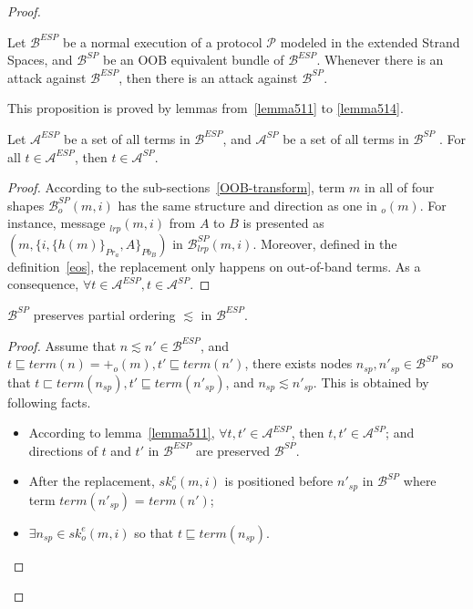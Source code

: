 \begin{Definition}
\begin{table}[b]
\begin{proof}
\begin{Proposition}
Let $\mathcal{B}^{ESP}$ be a normal execution of a protocol $\mathcal{P}$ modeled in the extended Strand Spaces, and $\mathcal{B}^{SP}$ be an OOB equivalent bundle of $\mathcal{B}^{ESP}$. Whenever there is an attack against $\mathcal{B}^{ESP}$, then there is an attack against $\mathcal{B}^{SP}$. 
\end{Proposition}

This proposition is proved by lemmas from~\ref{lemma511} to \ref{lemma514}. 

\begin{Lemma}\label{lemma511}
Let $\mathcal{A}^{ESP}$ be a set of all terms in $\mathcal{B}^{ESP}$, and $\mathcal{A}^{SP}$ be a set of all terms in $\mathcal{B}^{SP}$ . For all $t \in \mathcal{A}^{ESP}$, then $t \in \mathcal{A}^{SP}$. 
\end{Lemma}
\begin{proof}
According to the sub-sections~\ref{OOB-transform}, term $m$ in all of four shapes $\mathcal{B}^{SP}_o(m,i)$ has the same structure and direction as one in $_o(m)$. For instance, message $_{lrp}(m,i)$ from $A$ to $B$ is presented as $(m, \{i,\{h(m)\}_{Pr_a},A\}_{Pb_B})$ in $\mathcal{B}^{SP}_{lrp}(m,i)$. Moreover, defined in the definition~\ref{eos}, the replacement only happens on out-of-band terms. As a consequence, $\forall t \in \mathcal{A}^{ESP}, t \in \mathcal{A}^{SP}$.
\end{proof}

\begin{Lemma}\label{lemma512}
$\mathcal{B}^{SP}$ preserves partial ordering $\lesssim$ in $\mathcal{B}^{ESP}$.    
\end{Lemma}

\begin{proof}
Assume that $n \lesssim n' \in \mathcal{B}^{ESP}$, and $t \sqsubseteq term(n) = +_o(m), t' \sqsubseteq term(n')$,  there exists nodes $n_{sp},n'_{sp} \in \mathcal{B}^{SP}$ so that $t \sqsubset term(n_{sp}), t' \sqsubseteq term(n'_{sp})$, and $n_{sp} \lesssim n'_{sp} $. This is obtained by following facts. 
\begin{itemize}
\item According to lemma~\ref{lemma511}, $\forall t,t' \in \mathcal{A}^{ESP}$, then $t,t' \in \mathcal{A}^{SP}$; and directions of $t$ and $t'$ in $\mathcal{B}^{ESP}$ are preserved $\mathcal{B}^{SP}$.
\item After the replacement, $sk^e_o(m,i)$ is positioned before $n'_{sp}$ in $\mathcal{B}^{SP}$ where term $term(n'_{sp})$ = $term(n')$;
\item $\exists n_{sp} \in sk^e_o(m,i)$ so that $t \sqsubseteq term(n_{sp})$. 
\end{itemize}


\end{proof}
\end{proof}
\end{table}
\end{Definition}
